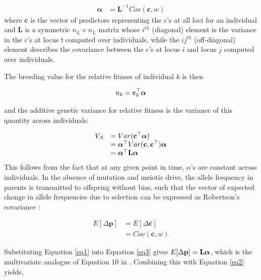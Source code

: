 \documentclass[12pt]{article}
\makeatletter
\providecommand{\DIFaddtex}[1]{{\protect\color{blue}\uwave{#1}}} %
\providecommand{\DIFdeltex}[1]{{\protect\color{red}\sout{#1}}} %
\providecommand{\DIFaddbegin}{} %
\providecommand{\DIFaddend}{} %
\providecommand{\DIFdelbegin}{} %
\providecommand{\DIFdelend}{} %
\providecommand{\DIFadd}[1]{\texorpdfstring{\DIFaddtex{#1}}{#1}} %
\providecommand{\DIFdel}[1]{\texorpdfstring{\DIFdeltex{#1}}{}} %
\newcommand{\DIFscaledelfig}{0.5}
\newlength{\DIFdelgraphicswidth} %
\newlength{\DIFdelgraphicsheight} %
\newcommand{\DIFaddincludegraphics}[2][]{{\color{blue}\fbox{\DIFOincludegraphics[#1]{#2}}}} %
\newcommand{\DIFdelincludegraphics}[2][]{%
\sbox{\DIFdelgraphicsbox}{\DIFOincludegraphics[#1]{#2}}%
\settoboxwidth{\DIFdelgraphicswidth}{\DIFdelgraphicsbox} %
\settoboxtotalheight{\DIFdelgraphicsheight}{\DIFdelgraphicsbox} %
\scalebox{\DIFscaledelfig}{%
\parbox[b]{\DIFdelgraphicswidth}{\usebox{\DIFdelgraphicsbox}\\[-\baselineskip] \rule{\DIFdelgraphicswidth}{0em}}\llap{\resizebox{\DIFdelgraphicswidth}{\DIFdelgraphicsheight}{%
\setlength{\unitlength}{\DIFdelgraphicswidth}%
\begin{picture}(1,1)%
\thicklines\linethickness{2pt} %
{\color[rgb]{1,0,0}\put(0,0){\framebox(1,1){}}}%
{\color[rgb]{1,0,0}\put(0,0){\line( 1,1){1}}}%
{\color[rgb]{1,0,0}\put(0,1){\line(1,-1){1}}}%
\end{picture}%
}\hspace*{3pt}}} %
} %
\DeclareRobustCommand{\DIFaddbegin}{\DIFOaddbegin \let\includegraphics\DIFaddincludegraphics} %
\DeclareRobustCommand{\DIFaddend}{\DIFOaddend \let\includegraphics\DIFOincludegraphics} %
\DeclareRobustCommand{\DIFdelbegin}{\DIFOdelbegin \let\includegraphics\DIFdelincludegraphics} %
\DeclareRobustCommand{\DIFdelend}{\DIFOaddend \let\includegraphics\DIFOincludegraphics} %
\let\sout@orig\sout %
\renewcommand{\sout}[1]{\ifmmode\text{\sout@orig{\ensuremath{#1}}}\else\sout@orig{#1}\fi} %
\makeatother
\begin{document}
\begin{bibunit}
\begin{equation} \label{eq1}
\begin{array}{rl} 
\boldsymbol{{\alpha}} &= \textbf{L}^{-1}Cov(\textbf{c}, w) 
\end{array}
\end{equation}
where $\textbf{c}$ is the vector of predictors representing the $c$'s at all loci for an individual and $\textbf{L}$ is a symmetric ${n_L} \times {n_L}$ matrix whose $i^{th}$ (diagonal) element is the variance in the $c$'s at locus \DIFdelbegin \DIFdel{i }\DIFdelend \DIFaddbegin \DIFadd{$i$ }\DIFaddend computed over individuals, while the  $ij^{th}$ (off-diagonal) element describes the covariance between the $c$'s at locus $i$ and locus $j$ computed over individuals. 

The breeding value for the relative fitness of individual $k$ is then

$$u_k = {\bf c}^{\top}_{k}\boldsymbol{{\alpha}}$$


and the additive genetic variance for relative fitness is the variance of this quantity across individuals:

\begin{equation} \label{eq2}
\begin{array}{rl} 
{V_A} &= Var({\bf c}^{\top}\boldsymbol{{\alpha}}) \\ 
&= \boldsymbol{{\alpha}}^{\top}Var({\bf c}, {\bf c}^{\top})\boldsymbol{{\alpha}}\\ 
&= \boldsymbol{\alpha}^{\top}\textbf{L}\boldsymbol{\alpha}\\
\end{array}
\end{equation}
This follows from the fact that at any given point in time, $\alpha$'s are constant across individuals. In the absence of mutation and meiotic drive, the allele frequency in parents is transmitted to offspring without bias, such that the vector of expected change in allele frequencies due to selection can be expressed as Robertson's covariance \citep{robertson1966mathematical, price1970selection, queller2017fundamental}:

\begin{equation} \label{eq3}
\begin{array}{rl}
E[\Delta{\textbf{p}}] &= E[\Delta\bar{{\textbf{c}}}]\\
&= Cov(\textbf{c}, w)
\end{array}
\end{equation}

Substituting Equation \ref{eq1} into Equation \ref{eq3} gives $E[\Delta{\textbf{p}}] = {\bf L}\boldsymbol{\alpha}$, which is the multivariate analogue of Equation 10 in \citet{Kirkpatrick.2002}. Combining this with Equation \ref{eq2} yields,


\end{bibunit}
\end{document}
